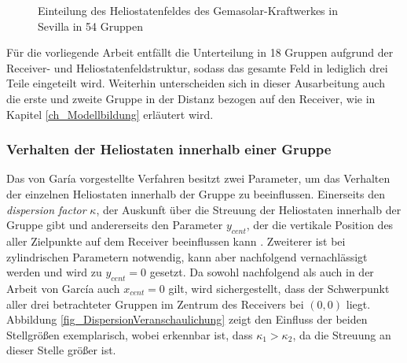 \begin{figure}[h!]
    \centering
    \setlength{\fboxsep}{1pt}
    \setlength{\fboxrule}{1pt}
\caption[Einteilung des Heliostatenfeldes des Gemasolar-Kraftwerkes in Sevilla in 54 Gruppen]{Einteilung des Heliostatenfeldes des Gemasolar-Kraftwerkes in Sevilla in 54 Gruppen \cite[S. 10]{Garcia2}}
    \label{fig_VerteilungHeliostateGarcia}
\end{figure}

Für die vorliegende Arbeit entfällt die Unterteilung in 18 Gruppen aufgrund der Receiver- und Heliostatenfeldstruktur, sodass das gesamte Feld in lediglich drei Teile eingeteilt wird.
Weiterhin unterscheiden sich in dieser Ausarbeitung auch die erste und zweite Gruppe in der Distanz bezogen auf den Receiver, wie in Kapitel \ref{ch_Modellbildung} erläutert wird.

\subsubsection*{Verhalten der Heliostaten innerhalb einer Gruppe} \label{subsubsec_Gruppenverhalten}
Das von Garía vorgestellte Verfahren besitzt zwei Parameter, um das Verhalten der einzelnen Heliostaten innerhalb der Gruppe zu beeinflussen.
Einerseits den \textit{dispersion factor} $\kappa$, der Auskunft über die Streuung der Heliostaten innerhalb der Gruppe gibt und andererseits den Parameter $y_{cent}$, der die vertikale Position des  aller Zielpunkte auf dem Receiver beeinflussen kann \cite[S. 5]{Garcia2}.
Zweiterer ist bei zylindrischen Parametern notwendig, kann aber nachfolgend vernachlässigt werden und wird zu $y_{cent} = 0$ gesetzt.
Da sowohl nachfolgend als auch in der Arbeit von García auch $x_{cent} = 0$ gilt, wird sichergestellt, dass der Schwerpunkt aller drei betrachteter Gruppen im Zentrum des Receivers bei $(0,0)$ liegt.
Abbildung \ref{fig_DispersionVeranschaulichung} zeigt den Einfluss der beiden Stellgrößen exemplarisch, wobei erkennbar ist, dass $\kappa_1 > \kappa_2$, da die Streuung an dieser Stelle größer ist.


